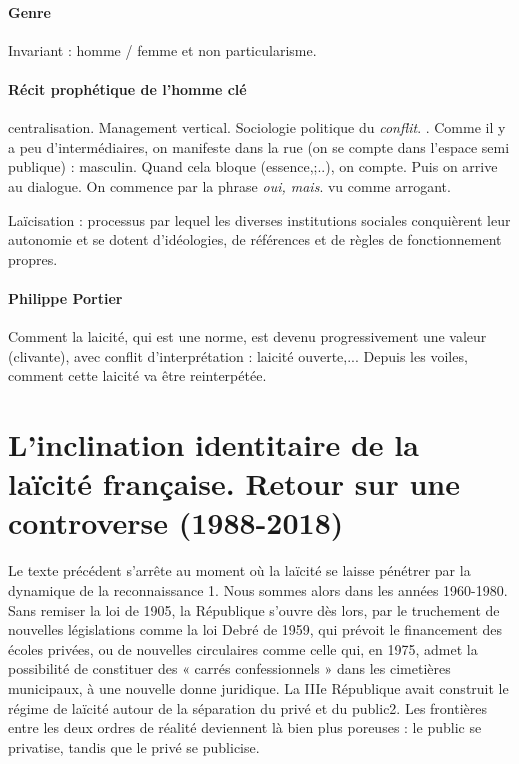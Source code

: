 \paragraph{Genre} Invariant : homme / femme et non particularisme. 

\paragraph{Récit prophétique de l'homme clé} centralisation. Management vertical. Sociologie politique du \textit{conflit}. . Comme il y a peu d'intermédiaires, on manifeste dans la rue (on se compte dans l'espace semi publique) : masculin.  Quand cela bloque (essence,;..), on compte. Puis on arrive au dialogue.  On commence par la phrase \textit{oui, mais}. vu comme arrogant.  




Laïcisation : processus par lequel les diverses institutions sociales conquièrent leur autonomie et se
dotent d’idéologies, de références et de règles de fonctionnement propres.

\paragraph{Philippe Portier} Comment la laicité, qui est une norme, est devenu progressivement une valeur (clivante), avec conflit d'interprétation : laicité ouverte,...   Depuis les voiles, comment cette laicité va être reinterpétée. 



\section{L’inclination identitaire de la laïcité française.
Retour sur une controverse (1988-2018)}






Le texte précédent s’arrête au moment où la laïcité se laisse pénétrer par la dynamique de la reconnaissance 1. Nous sommes alors dans les années 1960-1980. Sans remiser la loi de 1905, la République s’ouvre dès lors, par le truchement de nouvelles législations comme la loi Debré de 1959, qui prévoit le financement des écoles privées, ou de nouvelles circulaires comme celle qui, en 1975, admet la possibilité de constituer des
« carrés confessionnels » dans les cimetières municipaux, à une nouvelle donne juridique. La IIIe République avait construit le régime de laïcité autour de la séparation du privé et du public2. Les frontières entre les deux ordres de réalité deviennent là bien plus poreuses : le public se privatise, tandis que le privé se publicise.

